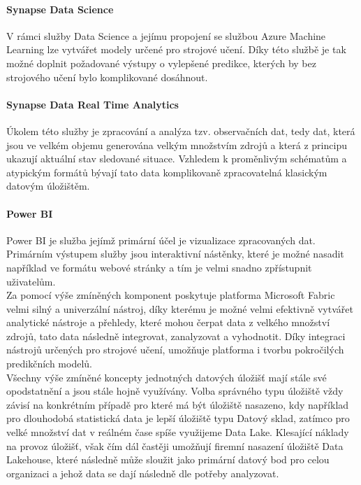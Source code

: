 \documentclass[
  digital,     %
  twoside,     %
  lof,         %
  lot,         %
]{fithesis4}
\begin{document}
\paragraph{Synapse Data Science}
V rámci služby Data Science a jejímu propojení se službou Azure Machine Learning lze vytvářet modely určené pro strojové učení. Díky této službě je tak možné doplnit požadované výstupy o vylepšené predikce, kterých by bez strojového učení bylo komplikované dosáhnout.\parencite{DataScience}

\paragraph{Synapse Data Real Time Analytics}
Úkolem této služby je zpracování a analýza tzv. observačních dat, tedy dat, která jsou ve velkém objemu generována velkým množstvím zdrojů a která z principu ukazují aktuální stav sledované situace. Vzhledem k proměnlivým schématům a atypickým formátů bývají tato data komplikovaně zpracovatelná klasickým datovým úložištěm.\parencite{RealTimeAnalytics}

\paragraph{Power BI}
Power BI je služba jejímž primární účel je vizualizace zpracovaných dat. Primárním výstupem služby jsou interaktivní nástěnky, které je možné nasadit například ve formátu webové stránky a tím je velmi snadno zpřístupnit uživatelům.\parencite{PowerBi}\\

Za pomocí výše zmíněných komponent poskytuje platforma Microsoft Fabric velmi silný a univerzální nástroj, díky kterému je možné velmi efektivně vytvářet analytické nástroje a přehledy, které mohou čerpat data z velkého množství zdrojů, tato data následně integrovat, zanalyzovat a vyhodnotit. Díky integraci nástrojů určených pro strojové učení, umožňuje platforma i tvorbu pokročilých predikčních modelů.\\

Všechny výše zmíněné koncepty jednotných datových úložišť mají stále své opodstatnění a jsou stále hojně využívány. Volba správného typu úložiště vždy závisí na konkrétním případě pro které má být úložiště nasazeno, kdy například pro dlouhodobá statistická data je lepší úložiště typu Datový sklad, zatímco pro velké množství dat v reálném čase spíše využijeme Data Lake. Klesající náklady na provoz úložišť, však čím dál častěji umožňují firemní nasazení úložiště Data Lakehouse, které následně může sloužit jako primární datový bod pro celou organizaci a jehož data se dají následně dle potřeby analyzovat.
\end{document}
